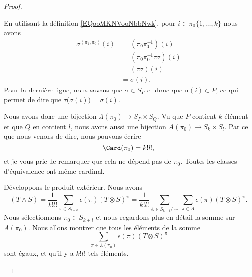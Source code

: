 \begin{proof}
\begin{subproof}
\begin{subproof}
			En utilisant la définition \ref{EQooMKNVooNbbNwk}, pour \( i\in\pi_0\{ 1,\ldots,k \}\) nous avons
			\begin{subequations}
				\begin{align}
					\sigma^{(\pi_1,\pi_0)}(i) & =(\pi_0\pi_1^{-1})(i)           \\
					                          & =(\pi_0\pi_0^{-1}\tau\sigma)(i) \\
					                          & =(\tau\sigma)(i)                \\
					                          & =\sigma(i).
				\end{align}
			\end{subequations}
			Pour la dernière ligne, nous savons que \( \sigma\in S_P\) et donc que \( \sigma(i)\in P\), ce qui permet de dire que \( \tau\big( \sigma(i) \big)=\sigma(i)\).
		\end{subproof}
		Nous avons donc une bijection \( A(\pi_0)\to S_P\times S_Q\). Vu que \( P\) contient \( k\) élément et que \( Q\) en contient \( l\), nous avons aussi une bijection \( A(\pi_0)\to S_k\times S_l\).
		\spitem[Cardinal de \( A(\pi_0) \)]
		Par ce que nous venons de dire, nous pouvons écrire
		\begin{equation}
			\Card(\pi_0)=k!l!,
		\end{equation}
		et je vous prie de remarquer que cela ne dépend pas de \( \pi_0\). Toutes les classes d'équivalence ont même cardinal.

		Développons le produit extérieur. Nous avons
		\begin{equation}		\label{EQooEQNJooDYrITi}
			(T\wedge S)=\frac{1}{ k!l!}\sum_{\pi\in S_{l+k}}\epsilon(\pi)(T\otimes S)^{\pi}=\frac{1}{ k!l!}\sum_{A\in S_{k+l}/\sim}\sum_{\pi\in A}\epsilon(\pi)(T\otimes S)^{\pi}.
		\end{equation}
		Nous sélectionnons \( \pi_0\in S_{k+l}\) et nous regardons plus en détail la somme sur \( A(\pi_0)\). Nous allons montrer que tous les éléments de la somme
		\begin{equation}
			\sum_{\pi\in A(\pi_0)}\epsilon(\pi)(T\otimes S)^{\pi}
		\end{equation}
		sont égaux, et qu'il y a \( k!l!\) tels éléments.


\end{subproof}
\end{proof}
